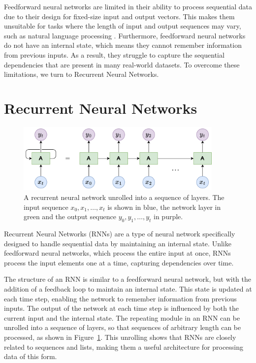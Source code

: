 \documentclass{article}
\newcommand{\reffig}[1]{Figure~\ref{#1}}
\begin{document}
Feedforward neural networks are limited in their ability to process sequential data due to
their design for fixed-size input and output vectors. This makes them unsuitable for tasks
where the length of input and output sequences may vary, such as natural language
processing \cite{Sundermeyer2015}. Furthermore, feedforward neural networks do not have an
internal state, which means they cannot remember information from previous inputs. As a
result, they struggle to capture the sequential dependencies that are present in many
real-world datasets. To overcome these limitations, we turn to Recurrent Neural Networks.



\section{Recurrent Neural Networks}
\label{ch:2}

\begin{figure}[htbp]
  \centering
  \includegraphics[width=0.9\textwidth]{RNN Unrolled.drawio.png}
  \caption{A recurrent neural network unrolled into a sequence of layers. The input
    sequence $x_0, x_1, \ldots, x_t$ is shown in blue, the network layer in green and the
    output sequence $y_0, y_1, \ldots, y_t$ in purple.}
  \label{fig:rnn-unrolled}
\end{figure}

Recurrent Neural Networks (RNNs) are a type of neural network specifically designed to
handle sequential data by maintaining an internal state. Unlike feedforward neural
networks, which process the entire input at once, RNNs process the input elements one at a
time, capturing dependencies over time.

The structure of an RNN is similar to a feedforward neural network, but with the addition
of a feedback loop to maintain an internal state. This state is updated at each time step,
enabling the network to remember information from previous inputs. The output of the
network at each time step is influenced by both the current input and the internal state.
The repeating module in an RNN can be unrolled into a sequence of layers, so that
sequences of arbitrary length can be processed, as shown in \reffig{fig:rnn-unrolled}.
This unrolling shows that RNNs are closely related to sequences and lists, making them a
useful architecture for processing data of this form.
\end{document}
